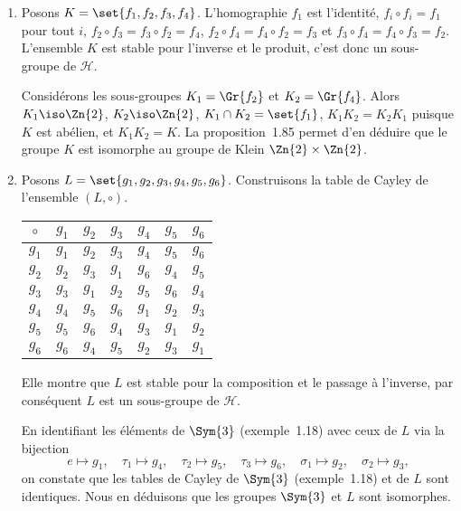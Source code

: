 \begin{enumerate}
  \item %
    Posons $K = \set{f_1, f_2, f_3, f_4}$.
    L'homographie $f_1$ est l'identité, $f_i\circ f_i = f_1$ pour tout $i$, $f_2\circ f_3 = f_3\circ f_2 = f_4$, $f_2\circ f_4 = f_4\circ f_2 = f_3$ et $f_3\circ f_4 = f_4\circ f_3 = f_2$.
    L'ensemble $K$ est stable pour l'inverse et le produit, c'est donc un sous-groupe de $\mathcal{H}$.

    Considérons les sous-groupes $K_1 = \Gr{f_2}$ et $K_2 = \Gr{f_4}$.
    Alors $K_1 \iso \Zn{2}$, $K_2 \iso \Zn{2}$, $K_1\cap K_2 = \set{f_1}$, $K_1K_2 = K_2K_1$ puisque $K$ est abélien, et $K_1 K_2 = K$.
    La proposition~1.85 permet d'en déduire que le groupe $K$ est isomorphe au groupe de Klein $\Zn{2}\times\Zn{2}$.

  \item %
    Posons $L = \set{g_1, g_2, g_3, g_4, g_5, g_6}$.
    Construisons la table de Cayley de l'ensemble $(L, \circ)$.
    \begin{center}
      \begin{tabular}{c|*{6}c}
        $\circ$ & $g_1$ & $g_2$ & $g_3$ & $g_4$ & $g_5$ & $g_6$ \\
        \midrule
          $g_1$ & $g_1$ & $g_2$ & $g_3$ & $g_4$ & $g_5$ & $g_6$ \\
          $g_2$ & $g_2$ & $g_3$ & $g_1$ & $g_6$ & $g_4$ & $g_5$ \\
          $g_3$ & $g_3$ & $g_1$ & $g_2$ & $g_5$ & $g_6$ & $g_4$ \\
          $g_4$ & $g_4$ & $g_5$ & $g_6$ & $g_1$ & $g_2$ & $g_3$ \\
          $g_5$ & $g_5$ & $g_6$ & $g_4$ & $g_3$ & $g_1$ & $g_2$ \\
          $g_6$ & $g_6$ & $g_4$ & $g_5$ & $g_2$ & $g_3$ & $g_1$ \\
      \end{tabular}
    \end{center}
    Elle montre que $L$ est stable pour la composition et le passage à l'inverse, par conséquent $L$ est un sous-groupe de $\mathcal{H}$.

    En identifiant les éléments de $\Sym{3}$ (exemple~1.18) avec ceux de $L$ via la bijection
    \[
      e \mapsto g_1, \quad \tau_1 \mapsto g_4, \quad \tau_2 \mapsto g_5,
      \quad \tau_3 \mapsto g_6, \quad \sigma_1 \mapsto g_2, \quad \sigma_2 \mapsto g_3,
    \]
    on constate que les tables de Cayley de $\Sym{3}$ (exemple~1.18) et de $L$ sont identiques.
    Nous en déduisons que les groupes $\Sym{3}$ et $L$ sont isomorphes.
\end{enumerate}

